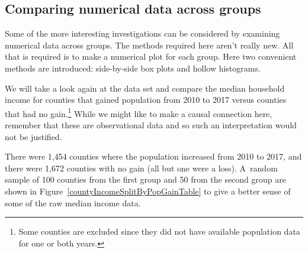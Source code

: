 
\subsection{Comparing numerical data across groups}
\label{comparingAcrossGroups}


Some of the more interesting investigations can be considered
by examining numerical data across groups.
The methods required here aren't really new.
All that is required is to make a numerical plot for each group.
Here two convenient methods are introduced: side-by-side
box plots and hollow histograms.

We will take a look again at the  data set
and compare the median household income for counties that
gained population from 2010 to 2017 versus counties that
had no gain.\footnote{Some counties are excluded since
  they did not have available population data for one
  or both years.}
While we might like to make a causal connection here,
remember that these are observational data and so such
an interpretation would not be justified.

\newcommand{\numcountieswithgains}{1454}
\newcommand{\numcountieswithgainsC}{1,454}
\newcommand{\numcountieswithoutgains}{1672}
\newcommand{\numcountieswithoutgainsC}{1,672}

There were \numcountieswithgainsC{} counties where
the population increased from 2010 to 2017, and there
were \numcountieswithoutgainsC{} counties with no gain
(all but one were a loss).
A~random sample of 100 counties from the first group and
50 from the second group are shown in
Figure~\ref{countyIncomeSplitByPopGainTable}
to give a better sense of some of the raw median
income data.

